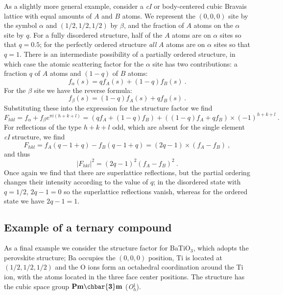 As a slightly more general example, consider a \textit{cI} or body-centered cubic Bravais lattice with equal amounts of $A$ and $B$ atoms. We represent the $(0,0,0)$ site by the symbol $\alpha$ and $(1/2,1/2,1/2)$ by $\beta$, and the fraction of $A$ atoms on the $\alpha$ site by $q$.  For a fully disordered structure, half of the $A$ atoms are on $\alpha$ sites so that $q=0.5$; for the perfectly ordered structure \textit{all} $A$ atoms are on $\alpha$ sites so that $q=1$.  There is an intermediate possibility of a partially ordered structure, in which case the atomic scattering factor for the $\alpha$ site has two contributions: a fraction $q$ of $A$ atoms and $(1-q)$ of $B$ atoms:
\[
	f_{\alpha}(s) = q f_A(s) + (1-q) f_B(s)\ .
\]
For the $\beta$ site we have the reverse formula:
\[
	f_{\beta}(s) = (1-q) f_A(s) + q f_B(s)\ .
\]
Substituting these into the expression for the structure factor we find
\[
	F_{hkl}=f_\alpha+f_\beta e^{\pi i(h+k+l)}=(qf_{A}+(1-q)f_{B})+((1-q)f_{A}+qf_{B})\times(-1)^{h+k+l}\ .
\]
For reflections of the type $h+k+l$ odd, which are absent for the single element \textit{cI} structure, we find
\[
	F_{hkl}=f_{A}(q-1+q)-f_{B}(q-1+q)=(2q-1)\times(f_{A}-f_{B})\ ,
\]
and thus 
\[
	\vert F_{hkl}\vert^2 = (2q-1)^2\left(f_{A}-f_{B}\right)^2\ .
\]
Once again we find that there are superlattice reflections, but the partial ordering changes their intensity according to the value of $q$; in the disordered state with $q=1/2$, $2q-1=0$ so the superlattice reflections vanish, whereas for the ordered state we have $2q-1=1$.

\subsection{Example of a ternary compound}\label{\chabbr:ssec:SFternary}
As a final example we consider the structure factor for BaTiO$_{3}$, which adopts the perovskite structure;  Ba occupies the $(0,0,0)$ position, Ti is located at $(1/2, 1/2,1/2)$ and the O ions form an octahedral coordination around the Ti ion, with the atoms located in the three face center positions.  The structure has the cubic space group $\mathbf{Pm\chbar{3}m}$ (\textit{O$_h^1$}).

